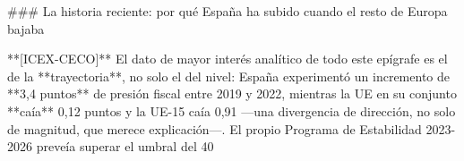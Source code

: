 \documentclass[10pt,a4paper]{article}
\begin{document}
### La historia reciente: por qué España ha subido cuando el resto de Europa bajaba

**[ICEX-CECO]** El dato de mayor interés analítico de todo este epígrafe es el de la **trayectoria**, no solo el del nivel: España experimentó un incremento de **3,4 puntos** de presión fiscal entre 2019 y 2022, mientras la UE en su conjunto **caía** 0,12 puntos y la UE-15 caía 0,91 —una divergencia de dirección, no solo de magnitud, que merece explicación—. El propio Programa de Estabilidad 2023-2026 preveía superar el umbral del 40%
\end{document}
